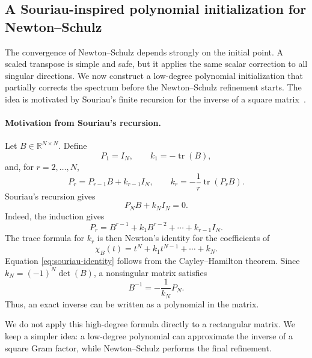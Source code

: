 \documentclass[12pt,a4paper]{article}
\theoremstyle{plain}
\theoremstyle{definition}
\theoremstyle{remark}
\begin{document}
\subsection{A Souriau-inspired polynomial initialization for Newton--Schulz} \label{subsec:souriau-poly-init}

The convergence of Newton--Schulz depends strongly on the initial point.  A scaled transpose is simple and safe, but it applies the same scalar correction to all singular directions.  We now construct a low-degree polynomial initialization that partially corrects the spectrum before the Newton--Schulz refinement starts.  The idea is motivated by Souriau's finite recursion for the inverse of a square matrix~\cite{Souriau1948, Souriau2007}.

\paragraph{Motivation from Souriau's recursion.}
Let $B\in\mathbb{R}^{N\times N}$.  Define
\[
    P_1=I_N, \qquad k_1=-\operatorname{tr}(B),
\]
and, for $r=2,\ldots,N$,
\[
    P_r=P_{r-1}B+k_{r-1}I_N, \qquad k_r=-\frac{1}{r}\operatorname{tr}(P_rB).
\]
Souriau's recursion \cite{Souriau1948,Souriau2007} gives
\begin{equation} \label{eq:souriau-identity}
    P_NB+k_NI_N=0.
\end{equation}
Indeed, the induction gives
\[
    P_r=B^{r-1}+k_1B^{r-2}+\cdots+k_{r-1}I_N.
\]
The trace formula for $k_r$ is then Newton's identity for the coefficients of
\[
    \chi_B(t)=t^N+k_1t^{N-1}+\cdots+k_N.
\]
Equation \eqref{eq:souriau-identity} follows from the Cayley--Hamilton theorem.  Since $k_N=(-1)^N\det(B)$, a nonsingular matrix satisfies
\begin{equation} \label{eq:souriau-inverse}
    B^{-1}=-\frac{1}{k_N}P_N.
\end{equation}
Thus, an exact inverse can be written as a polynomial in the matrix.

We do not apply this high-degree formula directly to a rectangular matrix.  We keep a simpler idea: a low-degree polynomial can approximate the inverse of a square Gram factor, while Newton--Schulz performs the final refinement.
\end{document}
